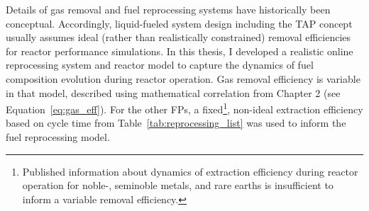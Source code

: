 Details of gas removal and fuel reprocessing systems have historically 
been conceptual. Accordingly, liquid-fueled system design including the 
\gls{TAP} concept usually assumes ideal (rather than realistically 
constrained) removal efficiencies for reactor performance simulations. In this 
thesis, I developed a realistic online reprocessing system and reactor model 
to capture the dynamics of fuel composition evolution during reactor 
operation. Gas removal efficiency is variable in that model, described using 
mathematical correlation from Chapter 2 (see Equation~\ref{eq:gas_eff}). For 
the other \glspl{FP}, a fixed\footnote{Published information about dynamics of 
extraction efficiency during reactor operation for noble-, seminoble metals, 
and rare earths is insufficient to inform a variable removal efficiency.}, 
non-ideal extraction efficiency based on cycle time from  
Table~\ref{tab:reprocessing_list} was used to inform the fuel reprocessing 
model.


